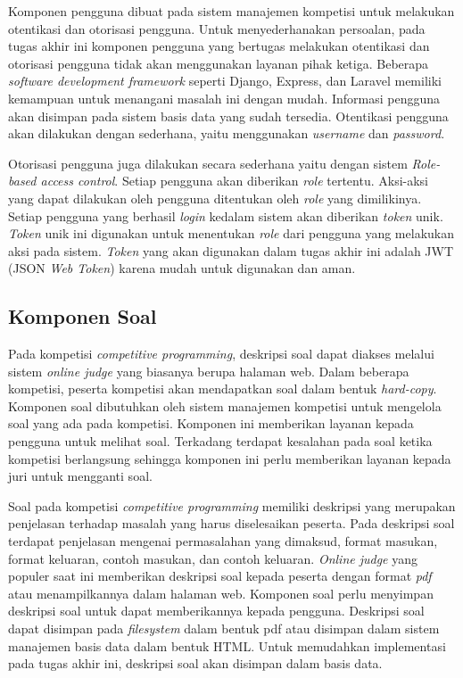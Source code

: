 \par Komponen pengguna dibuat pada sistem manajemen kompetisi untuk melakukan otentikasi dan otorisasi pengguna. Untuk menyederhanakan persoalan, pada tugas akhir ini komponen pengguna yang bertugas melakukan otentikasi dan otorisasi pengguna tidak akan menggunakan layanan pihak ketiga. Beberapa \textit{software development framework} seperti Django, Express, dan Laravel memiliki kemampuan untuk menangani masalah ini dengan mudah. Informasi pengguna akan disimpan pada sistem basis data yang sudah tersedia. Otentikasi pengguna akan dilakukan dengan sederhana, yaitu menggunakan \textit{username} dan \textit{password}.

\par Otorisasi pengguna juga dilakukan secara sederhana yaitu dengan sistem \textit{Role-based access control}. Setiap pengguna akan diberikan \textit{role} tertentu. Aksi-aksi yang dapat dilakukan oleh pengguna ditentukan oleh \textit{role} yang dimilikinya. Setiap pengguna yang berhasil \textit{login} kedalam sistem akan diberikan \textit{token} unik. \textit{Token} unik ini digunakan untuk menentukan \textit{role} dari pengguna yang melakukan aksi pada sistem. \textit{Token} yang akan digunakan dalam tugas akhir ini adalah JWT (JSON \textit{Web Token}) karena mudah untuk digunakan dan aman.

\subsection{Komponen Soal}

\par Pada kompetisi \textit{competitive programming}, deskripsi soal dapat diakses melalui sistem \textit{online judge} yang biasanya berupa halaman web. Dalam beberapa kompetisi, peserta kompetisi akan mendapatkan soal dalam bentuk \textit{hard-copy}. Komponen soal dibutuhkan oleh sistem manajemen kompetisi untuk mengelola soal yang ada pada kompetisi. Komponen ini memberikan layanan kepada pengguna untuk melihat soal. Terkadang terdapat kesalahan pada soal ketika kompetisi berlangsung sehingga komponen ini perlu memberikan layanan kepada juri untuk mengganti soal.

\par Soal pada kompetisi \textit{competitive programming} memiliki deskripsi yang merupakan penjelasan terhadap masalah yang harus diselesaikan peserta. Pada deskripsi soal terdapat penjelasan mengenai permasalahan yang dimaksud, format masukan, format keluaran, contoh masukan, dan contoh keluaran. \textit{Online judge} yang populer saat ini memberikan deskripsi soal kepada peserta dengan format \textit{pdf} atau menampilkannya dalam halaman web. Komponen soal perlu menyimpan deskripsi soal untuk dapat memberikannya kepada pengguna. Deskripsi soal dapat disimpan pada \textit{filesystem} dalam bentuk pdf atau disimpan dalam sistem manajemen basis data dalam bentuk HTML. Untuk memudahkan implementasi pada tugas akhir ini, deskripsi soal akan disimpan dalam basis data.

